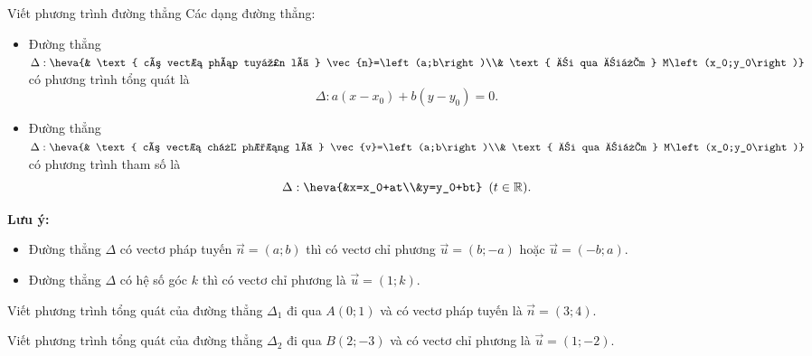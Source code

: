 \begin{dang}{Viết phương trình đường thẳng}
	Các dạng đường thẳng:
	\begin{itemize}
		\item Đường thẳng $\Delta: \heva{& \text{ có vectơ pháp tuyến là } \vec{n}=\left(a;b\right)\\& \text{ đi qua điểm } M\left(x_0;y_0\right)}$ có phương trình tổng quát là $$\Delta: a\left(x-x_0\right)+b\left(y-y_0\right)=0.$$ 
		\item Đường thẳng $\Delta: \heva{& \text{ có vectơ chỉ phương là } \vec{v}=\left(a;b\right)\\& \text{ đi qua điểm } M\left(x_0;y_0\right)}$ có phương trình tham số là $$\Delta: \heva{&x=x_0+at\\&y=y_0+bt}\,\,\,(t\in \mathbb{R}).$$ 
	\end{itemize}
	\begin{note}
		\textbf{Lưu ý:}
		\begin{itemize}
			\item Đường thẳng $\Delta$ có vectơ pháp tuyến $\vec{n}=(a;b)$ thì có vectơ chỉ phương $\vec{u}=(b;-a)$ hoặc $\vec{u}=(-b;a)$.
			\item Đường thẳng $\Delta$ có hệ số góc $k$ thì có vectơ chỉ phương là $\vec{u}=(1;k)$.
		\end{itemize}
	\end{note}
	
\end{dang}


\begin{vd}
	Viết phương trình tổng quát của đường thẳng $\Delta_1$ đi qua $A(0;1)$ và có vectơ pháp tuyến là $\vec{n}=(3;4)$.
\end{vd}

\begin{vd}
	Viết phương trình tổng quát của đường thẳng $\Delta_2$ đi qua $B(2;-3)$ và có vectơ chỉ phương là  $\vec{u}=(1;-2)$.
\end{vd}


